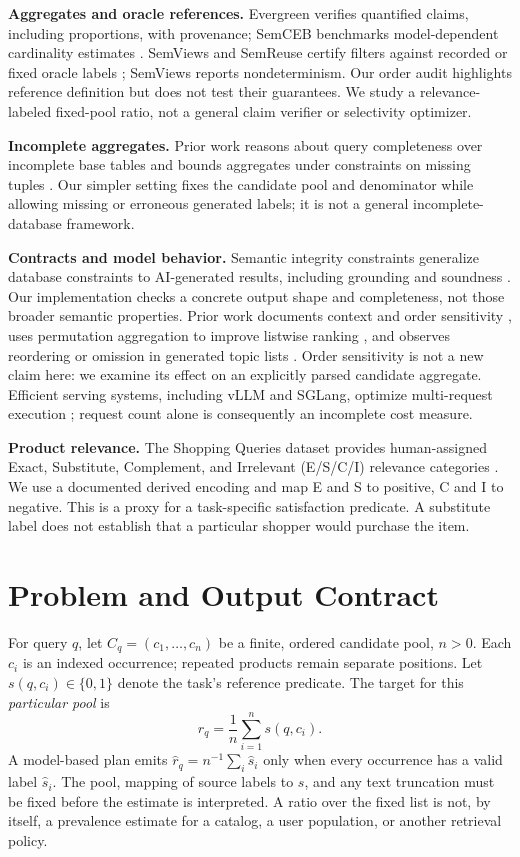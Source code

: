 \documentclass[conference]{IEEEtran}
\begin{document}
\textbf{Aggregates and oracle references.} Evergreen verifies quantified claims, including proportions, with provenance; SemCEB benchmarks model-dependent cardinality estimates \cite{evergreen,semceb}. SemViews and SemReuse certify filters against recorded or fixed oracle labels \cite{semviews,semreuse}; SemViews reports nondeterminism. Our order audit highlights reference definition but does not test their guarantees. We study a relevance-labeled fixed-pool ratio, not a general claim verifier or selectivity optimizer.

\textbf{Incomplete aggregates.} Prior work reasons about query completeness over incomplete base tables \cite{query_completeness} and bounds aggregates under constraints on missing tuples \cite{contingency}. Our simpler setting fixes the candidate pool and denominator while allowing missing or erroneous generated labels; it is not a general incomplete-database framework.

\textbf{Contracts and model behavior.} Semantic integrity constraints generalize database constraints to AI-generated results, including grounding and soundness \cite{constraints}. Our implementation checks a concrete output shape and completeness, not those broader semantic properties. Prior work documents context and order sensitivity \cite{lostmiddle}, uses permutation aggregation to improve listwise ranking \cite{permcons}, and observes reordering or omission in generated topic lists \cite{outputorder}. Order sensitivity is not a new claim here: we examine its effect on an explicitly parsed candidate aggregate. Efficient serving systems, including vLLM and SGLang, optimize multi-request execution \cite{vllm,sglang}; request count alone is consequently an incomplete cost measure.

\textbf{Product relevance.} The Shopping Queries dataset provides human-assigned Exact, Substitute, Complement, and Irrelevant (E/S/C/I) relevance categories \cite{esci}. We use a documented derived encoding \cite{derived} and map E and S to positive, C and I to negative. This is a proxy for a task-specific satisfaction predicate. A substitute label does not establish that a particular shopper would purchase the item.

\section{Problem and Output Contract}
For query $q$, let $C_q=(c_1,\ldots,c_n)$ be a finite, ordered candidate pool, $n>0$. Each $c_i$ is an indexed occurrence; repeated products remain separate positions. Let $s(q,c_i)\in\{0,1\}$ denote the task's reference predicate. The target for this \emph{particular pool} is
\begin{equation}
r_q=\frac{1}{n}\sum_{i=1}^{n}s(q,c_i).
\end{equation}
A model-based plan emits $\hat{r}_q=n^{-1}\sum_i\hat{s}_i$ only when every occurrence has a valid label $\hat{s}_i$. The pool, mapping of source labels to $s$, and any text truncation must be fixed before the estimate is interpreted. A ratio over the fixed list is not, by itself, a prevalence estimate for a catalog, a user population, or another retrieval policy.
\end{document}
